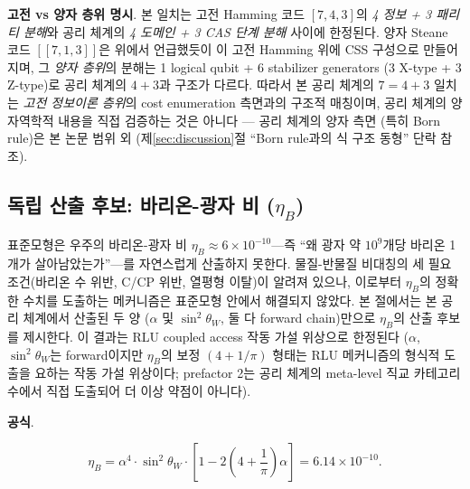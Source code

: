 \documentclass[entropy,article,submit,pdftex,oneauthor]{Definitions/mdpi}
\begin{document}
\textbf{고전 vs 양자 층위 명시}. 본 일치는 고전 Hamming 코드 $[7,4,3]$의 \emph{4 정보 + 3 패리티 분해}와 공리 체계의 \emph{4 도메인 + 3 CAS 단계 분해} 사이에 한정된다. 양자 Steane 코드 $[[7,1,3]]$은 위에서 언급했듯이 이 고전 Hamming 위에 CSS 구성으로 만들어지며, 그 \emph{양자 층위}의 분해는 1 logical qubit + 6 stabilizer generators (3 X-type + 3 Z-type)로 공리 체계의 $4+3$과 구조가 다르다. 따라서 본 공리 체계의 $7 = 4+3$ 일치는 \emph{고전 정보이론 층위}의 cost enumeration 측면과의 구조적 매칭이며, 공리 체계의 양자역학적 내용을 직접 검증하는 것은 아니다 --- 공리 체계의 양자 측면 (특히 Born rule)은 본 논문 범위 외 (제\ref{sec:discussion}절 ``Born rule과의 식 구조 동형'' 단락 참조).

\subsection{독립 산출 후보: 바리온-광자 비 ($\eta_B$)}
\label{sec:baryogenesis}

표준모형은 우주의 바리온-광자 비 $\eta_B \approx 6 \times 10^{-10}$---즉 ``왜 광자 약 $10^9$개당 바리온 1개가 살아남았는가''---를 자연스럽게 산출하지 못한다. 물질-반물질 비대칭의 세 필요 조건(바리온 수 위반, C/CP 위반, 열평형 이탈)이 알려져 있으나, 이로부터 $\eta_B$의 정확한 수치를 도출하는 메커니즘은 표준모형 안에서 해결되지 않았다. 본 절에서는 본 공리 체계에서 산출된 두 양 ($\alpha$ 및 $\sin^2\theta_W$, 둘 다 forward chain)만으로 $\eta_B$의 산출 후보를 제시한다. 이 결과는 RLU coupled access 작동 가설 위상으로 한정된다 ($\alpha$, $\sin^2\theta_W$는 forward이지만 $\eta_B$의 보정 $(4+1/\pi)$ 형태는 RLU 메커니즘의 형식적 도출을 요하는 작동 가설 위상이다; prefactor 2는 공리 체계의 meta-level 직교 카테고리 수에서 직접 도출되어 더 이상 약점이 아니다).

\textbf{공식}.
\begin{linenomath}
\begin{equation}
\eta_B = \alpha^4 \cdot \sin^2\theta_W \cdot \left[ 1 - 2\!\left(4 + \frac{1}{\pi}\right)\alpha \right] = 6.14 \times 10^{-10}.
\label{eq:eta-B}
\end{equation}
\end{linenomath}
\end{document}
